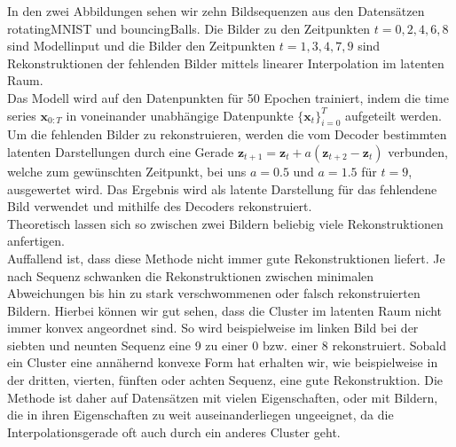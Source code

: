 \documentclass[12pt]{article}
\newcommand{\z}{\mathbf{z}}
\begin{document}
	In den zwei Abbildungen sehen wir zehn Bildsequenzen aus den Datensätzen rotatingMNIST und bouncingBalls. Die Bilder zu den Zeitpunkten $t=0,2,4,6,8$ sind Modellinput und die Bilder den Zeitpunkten $t=1,3,4,7,9$ sind Rekonstruktionen der fehlenden Bilder mittels linearer Interpolation im latenten Raum. \\
	Das Modell wird auf den Datenpunkten für 50 Epochen trainiert, indem die time series $\mathbf{x}_{0:T}$ in voneinander unabhängige Datenpunkte $\{\mathbf{x}_t\}_{i=0}^T$ aufgeteilt werden.
	Um die fehlenden Bilder zu rekonstruieren, werden die vom Decoder bestimmten latenten Darstellungen durch eine Gerade $\z_{t+1} = \z_t + a(\z_{t+2}-\z_t)$ verbunden, welche zum gewünschten Zeitpunkt, bei uns $a = 0.5$ und $a = 1.5$ für $t=9$, ausgewertet wird. 
	Das Ergebnis wird als latente Darstellung für das fehlendene Bild verwendet und mithilfe des Decoders rekonstruiert. \\
	Theoretisch lassen sich so zwischen zwei Bildern beliebig viele Rekonstruktionen anfertigen.\\
	Auffallend ist, dass diese Methode nicht immer gute Rekonstruktionen liefert. 
	Je nach Sequenz schwanken die Rekonstruktionen zwischen minimalen Abweichungen bis hin zu stark verschwommenen oder falsch rekonstruierten Bildern. Hierbei können wir gut sehen, dass die Cluster im latenten Raum 
	nicht immer konvex angeordnet sind. So wird beispielweise im linken Bild bei der siebten und 
	neunten Sequenz eine 9 zu einer 0 bzw. einer 8 rekonstruiert. Sobald ein Cluster eine annähernd konvexe Form hat erhalten wir, wie beispielweise in der 
	dritten, vierten, fünften oder achten Sequenz, eine gute Rekonstruktion. Die Methode ist daher auf Datensätzen mit vielen Eigenschaften, oder mit Bildern, die in ihren Eigenschaften zu weit auseinanderliegen ungeeignet, da die Interpolationsgerade oft auch durch ein anderes Cluster geht.
	\\
\end{document}
